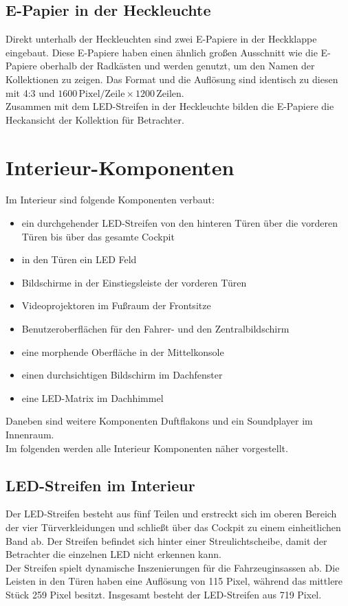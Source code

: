 \subsection{E-Papier in der Heckleuchte}
Direkt unterhalb der Heckleuchten sind zwei E-Papiere in der Heckklappe eingebaut.
Diese E-Papiere haben einen ähnlich großen Ausschnitt wie die E-Papiere oberhalb der Radkästen und werden genutzt, um den Namen der Kollektionen zu zeigen. Das Format und die Auflösung sind identisch zu diesen mit 4:3 und $ 1600 \,\mathrm{Pixel}/\mathrm{Zeile} \times 1200\,\mathrm{Zeilen} $.\\
Zusammen mit dem LED-Streifen in der Heckleuchte bilden die E-Papiere die Heckansicht der Kollektion für Betrachter.
\section{Interieur-Komponenten}
Im Interieur sind folgende Komponenten verbaut:
\begin{itemize}
	\item ein durchgehender LED-Streifen von den hinteren Türen über die vorderen Türen bis über das gesamte Cockpit
	\item in den Türen ein LED Feld
	\item Bildschirme in der Einstiegsleiste der vorderen Türen
	\item Videoprojektoren im Fußraum der Frontsitze
	\item Benutzeroberflächen für den Fahrer- und den Zentralbildschirm
	\item eine morphende Oberfläche in der Mittelkonsole
	\item einen durchsichtigen Bildschirm im Dachfenster
	\item eine LED-Matrix im Dachhimmel
\end{itemize}
Daneben sind weitere Komponenten Duftflakons und ein Soundplayer im Innenraum. \\
Im folgenden werden alle Interieur Komponenten näher vorgestellt.
\subsection{LED-Streifen im Interieur}
Der LED-Streifen besteht aus fünf Teilen und erstreckt sich im oberen Bereich der vier Türverkleidungen und schließt über das Cockpit zu einem einheitlichen Band ab. Der Streifen befindet sich hinter einer Streulichtscheibe, damit der Betrachter die einzelnen LED nicht erkennen kann. \\
Der Streifen spielt dynamische Inszenierungen für die Fahrzeuginsassen ab.
Die Leisten in den Türen haben eine Auflösung von 115 Pixel, während das mittlere Stück 259 Pixel besitzt. Insgesamt besteht der LED-Streifen aus 719 Pixel.
